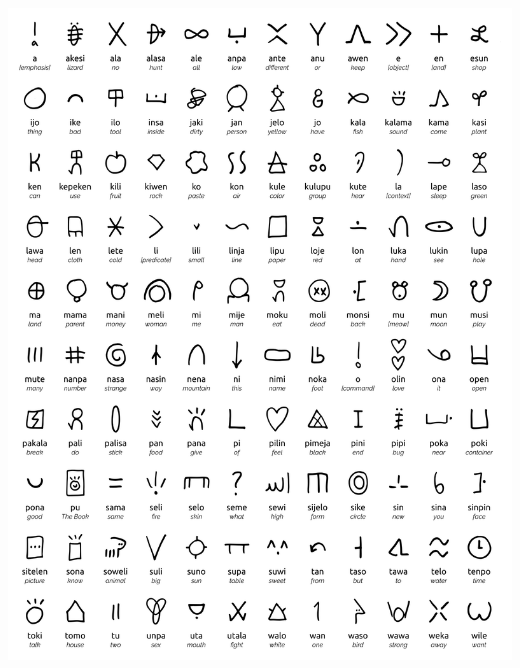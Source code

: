 \documentclass[10pt,a4paper]{article}
\begin{document}
\begin{center}
\includegraphics[width=0.75\linewidth]{tokipona.png}
\end{center}
\end{document}
